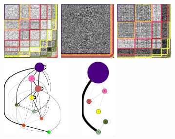 \begin{figure}[h]
	\centering
	
	\includegraphics[width=2.94cm, height=3cm]{img/M_g_peaks/figure_6}
	\endminipage
	\includegraphics[width=2.94cm, height=3cm]{img/M_g_power_law/figure_6}
	\endminipage
	\includegraphics[width=2.94cm, height=3cm]{img/M_g_regular/figure_6}
	\endminipage
    \vspace{0.3cm}
	\includegraphics[width=3.5cm, height=4cm]{img/M_g_peaks/graph_dot}
	\endminipage
    \hspace{1cm}\includegraphics[width=3.0cm, height=4cm]{img/M_g_power_law/graph_dot} 

\end{figure}

